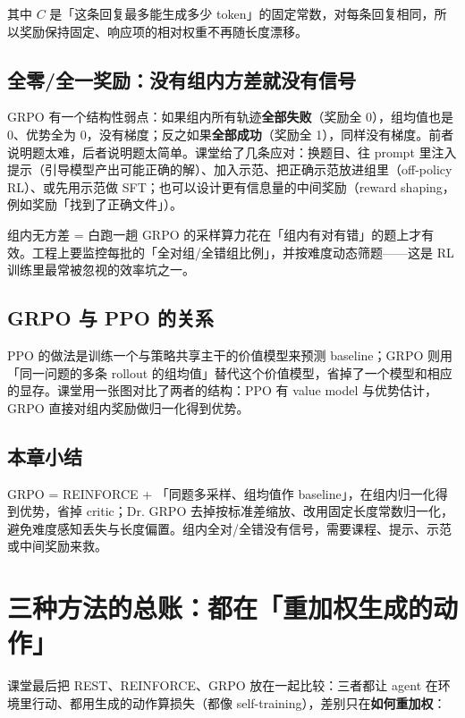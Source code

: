 \documentclass[a4paper]{article}
\begin{document}
其中 $C$ 是「这条回复最多能生成多少 token」的固定常数，对每条回复相同，所以奖励保持固定、响应项的相对权重不再随长度漂移。

\subsection{全零/全一奖励：没有组内方差就没有信号}

GRPO 有一个结构性弱点：如果组内所有轨迹\textbf{全部失败}（奖励全 0），组均值也是 0、优势全为 0，没有梯度；反之如果\textbf{全部成功}（奖励全 1），同样没有梯度。前者说明题太难，后者说明题太简单。课堂给了几条应对：换题目、往 prompt 里注入提示（引导模型产出可能正确的解）、加入示范、把正确示范放进组里（off-policy RL）、或先用示范做 SFT；也可以设计更有信息量的中间奖励（reward shaping，例如奖励「找到了正确文件」）。

\begin{warningbox}{组内无方差 = 白跑一趟}
GRPO 的采样算力花在「组内有对有错」的题上才有效。工程上要监控每批的「全对组/全错组比例」，并按难度动态筛题——这是 RL 训练里最常被忽视的效率坑之一。
\end{warningbox}

\subsection{GRPO 与 PPO 的关系}

PPO 的做法是训练一个与策略共享主干的价值模型来预测 baseline；GRPO 则用「同一问题的多条 rollout 的组均值」替代这个价值模型，省掉了一个模型和相应的显存。课堂用一张图对比了两者的结构：PPO 有 value model 与优势估计，GRPO 直接对组内奖励做归一化得到优势。

\subsection{本章小结}
GRPO = REINFORCE + 「同题多采样、组均值作 baseline」，在组内归一化得到优势，省掉 critic；Dr. GRPO 去掉按标准差缩放、改用固定长度常数归一化，避免难度感知丢失与长度偏置。组内全对/全错没有信号，需要课程、提示、示范或中间奖励来救。

\section{三种方法的总账：都在「重加权生成的动作」}

课堂最后把 REST、REINFORCE、GRPO 放在一起比较：三者都让 agent 在环境里行动、都用生成的动作算损失（都像 self-training），差别只在\textbf{如何重加权}：
\end{document}
